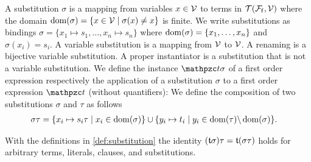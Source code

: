 
\begin{definition}\label{def:substitution}
	A {\myem substitution} $\sigma$ is a mapping from variables $x\in{\mathcal V}$ to terms in ${{\mathcal T}({\mathcal F}_{\mathsf f},{\mathcal V})}$
	where the {\myem domain }$\operatorname{dom}(\sigma) = \{ x\in{\mathcal V}\mid\sigma(x) \neq x \}$ is finite.
	We write substitutions as bindings $\sigma=\{ x_1\mapsto s_1,\ldots,x_n\mapsto s_n \}$
	where $\operatorname{dom}(\sigma)=\{ x_1,\ldots,x_n \}$ and $\sigma(x_i)=s_i$.
	A {\myem variable substitution} is a mapping from ${\mathcal V}$ to ${\mathcal V}$.
	A {\myem renaming} is a bijective variable substitution.
	A {\myem proper instantiator} is a substitution that is not a variable substitution.
	We define the instance $\mct\sigma$ of a first order expression
	respectively the application of a substitution $\sigma$ to a first order expression $\mct$ (without quantifiers):
	We define the {\myem composition} of two substitutions $\sigma$ and $\tau$ as follows
	\begin{align*}
		\sigma\tau&=\{ x_i\mapsto s_i\tau\mid x_i\in\operatorname{dom}(\sigma) \}
		\cup
		\{ y_i\mapsto t_i\mid y_i\in\operatorname{dom}(\tau) \backslash \operatorname{dom}(\sigma) \}.
	\end{align*}
	
\end{definition}

\begin{lemma}\label{lem:substitution}
	With the definitions in \ref{def:substitution} the identity
	$({\mathfrak t}\sigma)\tau = {\mathfrak t}(\sigma\tau)$ holds for
	arbitrary terms, literals, clauses, and substitutions.
\end{lemma}